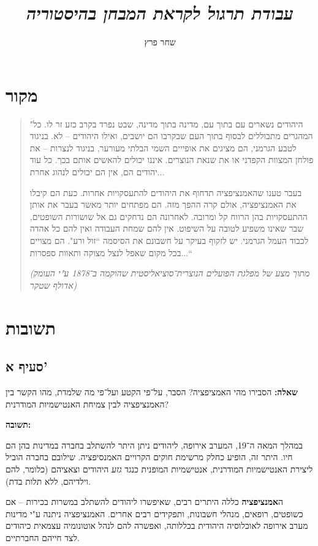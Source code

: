 \documentclass[]{article}
\author{שחר פרץ}
\title{\textit{עבודת תרגול לקראת המבחן בהיסטוריה}}
\begin{document}
	\maketitle
	\section*{מקור}
	
	\begin{quote}
		"היהודים נשארים עם בתוך עם, מדינה בתוך מדינה, שבט נפרד בקרב כזע זר לו. כל המהגרים מתבוללים לבסוף בתוך העם שבקרבו הם יושבים, ואילו היהודים – לא. בניגוד לטבע הגרמני, הם מציגים את אופייים השמי הבלתי מעורער, בניגוד לנצרות – את פולחן המצוות הקפדני או את שנאת הנוצרים. איננו יכולים להאשים אותם בכך. כל עוד יהודים הם, אין הם יכולים לנהוג אחרת...
		
		בעבר טענו שהאמנציפציה תדחוף את היהודים להתעסקויות אחרות. כעת הם קיבלו את האמנציפציה, אולם קרה ההפך מזה. הם מפתחים יותר מאשר בעבר את אותן ההתעסקויות בהן הרווח קל ומרובה. לאחרונה הם נדחקים גם אל שושורות השופטים, שבר שאינו משפיע לטובה על השיפוט. אין להם שמחת העבודה ואין להם כל אהדה לכבוד העמל הגרמני. יש לזקוף בעיקר על חשבונם את הסיסמה ``זול ורע". הם מצויים בכל מקום שאפל לנצל מצוקה ותאוות ספסרות...``
		
		\textit{(מתוך מצע של מפלגת הפועלים הנוצרית־סוציאליסטית שהוקמה ב־1878 ע"י העומק אדולף שטקר)}
	\end{quote}
	
	\section*{תשובות}
	\subsection*{סעיף א'}
		\textbf{שאלה: }הסבירו מהי האמציפציה? הסבר, על־פי הקטע ועל־פי מה שלמדת, מהו הקשר בין האמנציפציה לבין צמיחת האנטישמיות המודרנית? 
		
		\textbf{תשובה: }
		
		במהלך המאה ה־19, המערב אירופה, ליהודים ניתן היתר להשתלב בחברה במדינות בהן הם חיו. היתר זה, הופיע כחלק מרשימת חוקים הקרויים האמנסיפציה. שילובם בחברה הוביל ליצירת האנטישמיות המודרנית, אנטישמיות המופנית כנגד \textit{גזע} היהודים וצאציהם (כלומר, להם וילדיהם, ללא תלות בדת). 
		
		ה\textbf{אמנציפציה} כללה היתרים רבים, שאיפשרו ליהודים להשתלב במשרות בכירות – אם כשופטים, רופאים, מנהלי חשבונות, ותפקידים רבים אחרים. האמנציפציה ניתנה ע"י מדינות מערב אירופה לאוכלוסיה היהודית בכללותה, ואפשרה להם לנהל אוטונומיה עצמאית כיהודים לצד חייהם החברתיים. 
		
\end{document}
